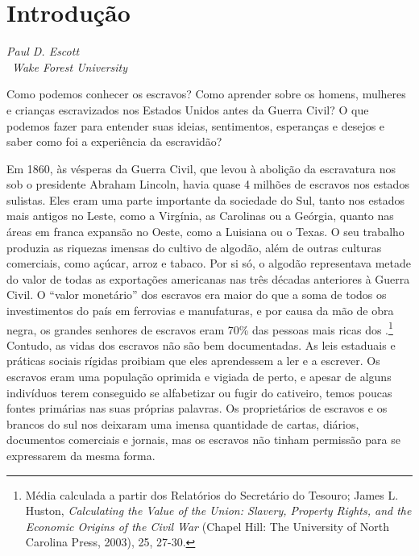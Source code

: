 \chapter*{Introdução}

\begin{flushright}
\emph{Paul D. Escott}\\\
\emph{Wake Forest University}
\end{flushright}

Como podemos conhecer os escravos? Como aprender sobre os homens,
mulheres e crianças escravizados nos Estados Unidos antes da Guerra
Civil? O que podemos fazer para entender suas ideias, sentimentos,
esperanças e desejos e saber como foi a experiência da escravidão?

Em 1860, às vésperas da Guerra Civil, que levou à abolição da
escravatura nos  sob o presidente Abraham Lincoln, havia quase 4
milhões de escravos nos estados sulistas. Eles eram uma parte importante
da sociedade do Sul, tanto nos estados mais antigos no Leste, como a
Virgínia, as Carolinas ou a Geórgia, quanto nas áreas em franca expansão
no Oeste, como a Luisiana ou o Texas. O seu trabalho produzia as
riquezas imensas do cultivo de algodão, além de outras culturas
comerciais, como açúcar, arroz e tabaco. Por si só, o algodão
representava metade do valor de todas as exportações americanas nas três
décadas anteriores à Guerra Civil. O ``valor monetário'' dos escravos
era maior do que a soma de todos os investimentos do país em ferrovias e
manufaturas, e por causa da mão de obra negra, os grandes senhores de
escravos eram 70\% das pessoas mais ricas dos \versal{EUA}.\footnote{Média
  calculada a partir dos Relatórios do Secretário do Tesouro; James L.
  Huston, \emph{Calculating the Value of the Union: Slavery, Property
  Rights, and the Economic Origins of the Civil War} (Chapel Hill: The
  University of North Carolina Press, 2003), 25, 27-30.} Contudo, as
vidas dos escravos não são bem documentadas. As leis estaduais e
práticas sociais rígidas proibiam que eles aprendessem a ler e a
escrever. Os escravos eram uma população oprimida e vigiada de perto, e
apesar de alguns indivíduos terem conseguido se alfabetizar ou fugir do
cativeiro, temos poucas fontes primárias nas suas próprias palavras. Os
proprietários de escravos e os brancos do sul nos deixaram uma imensa
quantidade de cartas, diários, documentos comerciais e jornais, mas os
escravos não tinham permissão para se expressarem da mesma forma.

